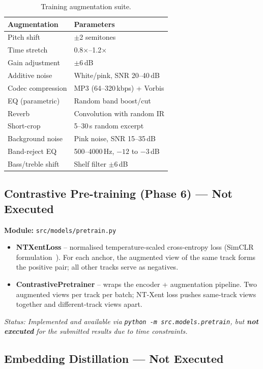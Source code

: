 \documentclass[11pt,a4paper]{article}
\begin{document}
\begin{table}[H]
\centering
\begin{tabular}{ll}
\toprule
\textbf{Augmentation} & \textbf{Parameters} \\
\midrule
Pitch shift & $\pm$2 semitones \\
Time stretch & 0.8$\times$--1.2$\times$ \\
Gain adjustment & $\pm$6\,dB \\
Additive noise & White/pink, SNR 20--40\,dB \\
Codec compression & MP3 (64--320\,kbps) + Vorbis \\
EQ (parametric) & Random band boost/cut \\
Reverb & Convolution with random IR \\
Short-crop & 5--30\,s random excerpt \\
Background noise & Pink noise, SNR 15--35\,dB \\
Band-reject EQ & 500--4000\,Hz, $-12$ to $-3$\,dB \\
Bass/treble shift & Shelf filter $\pm$6\,dB \\
\bottomrule
\end{tabular}
\caption{Training augmentation suite.}
\end{table}

\subsection{Contrastive Pre-training (Phase 6) --- Not Executed}

\textbf{Module:} \texttt{src/models/pretrain.py}

\begin{itemize}[nosep]
  \item \textbf{NTXentLoss} -- normalised temperature-scaled cross-entropy loss (SimCLR formulation~\cite{A5}). For each anchor, the augmented view of the same track forms the positive pair; all other tracks serve as negatives.
  \item \textbf{ContrastivePretrainer} -- wraps the encoder + augmentation pipeline. Two augmented views per track per batch; NT-Xent loss pushes same-track views together and different-track views apart.
\end{itemize}

\noindent
\textit{Status: Implemented and available via \texttt{python -m src.models.pretrain}, but \textbf{not executed} for the submitted results due to time constraints.}

\subsection{Embedding Distillation --- Not Executed}
\end{document}
